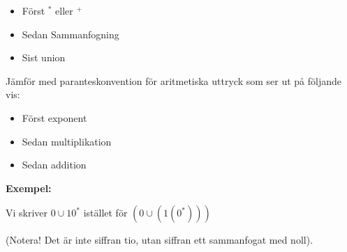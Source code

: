 \begin{itemize}
  \item Först $^*$ eller $^+$
  \item Sedan Sammanfogning
  \item Sist union
\end{itemize}
\par\bigskip
\noindent Jämför med paranteskonvention för aritmetiska uttryck som ser ut på följande vis:\par
\begin{itemize}
  \item Först exponent
  \item Sedan multiplikation
  \item Sedan addition
\end{itemize}
\par\bigskip
\noindent\textbf{Exempel:}\par
\noindent Vi skriver $0\cup10^*$ istället för $(0\cup(1(0^*)))$\par
\noindent (Notera! Det är inte siffran tio, utan siffran ett sammanfogat med noll).
